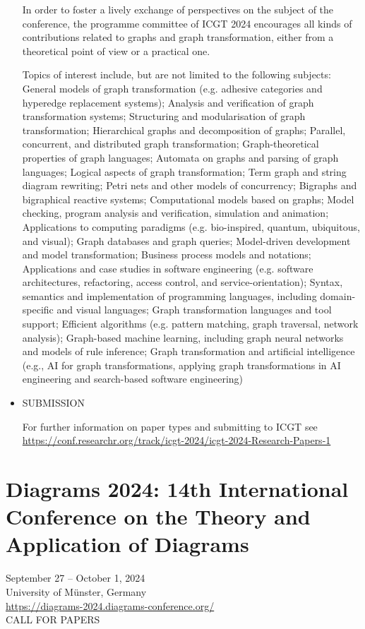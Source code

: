 \documentclass[prodmode,acmtecs]{acmsmall} %
\begin{document}
\begin{itemize}
  In order to foster a lively exchange of perspectives on the subject of the conference, the programme committee of ICGT 2024 encourages all kinds of contributions related to graphs and graph transformation, either from a theoretical point of view or a practical one. 
 
  Topics of interest include, but are not limited to the following subjects: General models of graph transformation (e.g. adhesive categories and hyperedge replacement systems); Analysis and verification of graph transformation systems; Structuring and modularisation of graph transformation; Hierarchical graphs and decomposition of graphs; Parallel, concurrent, and distributed graph transformation; Graph-theoretical properties of graph languages; Automata on graphs and parsing of graph languages; Logical aspects of graph transformation; Term graph and string diagram rewriting; Petri nets and other models of concurrency; Bigraphs and bigraphical reactive systems; Computational models based on graphs; Model checking, program analysis and verification, simulation and animation; Applications to computing paradigms (e.g. bio-inspired, quantum, ubiquitous, and visual); Graph databases and graph queries; Model-driven development and model transformation; Business process models and notations; Applications and case studies in software engineering (e.g. software architectures, refactoring, access control, and service-orientation); Syntax, semantics and implementation of programming languages, including domain-specific and visual languages; Graph transformation languages and tool support; Efficient algorithms (e.g. pattern matching, graph traversal, network analysis); Graph-based machine learning, including graph neural networks and models of rule inference; Graph transformation and artificial intelligence (e.g., AI for graph transformations, applying graph transformations in AI engineering and search-based software engineering)  
 
\item  SUBMISSION 
 
   For further information on paper types and submitting to ICGT see \href{https://conf.researchr.org/track/icgt-2024/icgt-2024-Research-Papers-1}{https://conf.researchr.org/track/icgt-2024/icgt-2024-Research-Papers-1} 
 
\end{itemize}\section{Diagrams 2024: 14th International Conference on the Theory and Application of Diagrams}\label{Diagrams2024}  September 27 – October 1, 2024\\ 
  University of Münster, Germany\\ 
  \href{https://diagrams-2024.diagrams-conference.org/}{https://diagrams-2024.diagrams-conference.org/}\\ 
CALL FOR PAPERS 
\end{document}
